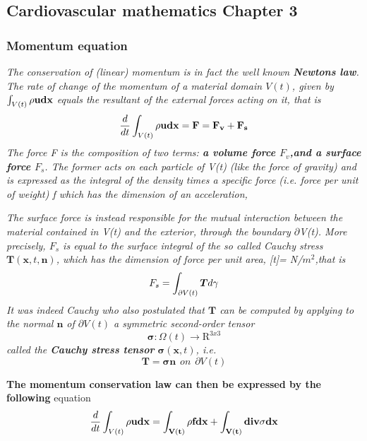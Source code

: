 \documentclass[11pt,letterpaper]{article}
\begin{document}
\subsection{Cardiovascular mathematics Chapter 3}

\subsubsection*{Momentum equation}
\textit{The conservation of (linear) momentum is in fact the well known \textbf{Newtons law}. The rate of change of the momentum of a material domain $V(t)$, given by $\int_{V(t)} \rho \bf{u} d\bf{x} $ equals the resultant of the external forces acting on it, that is \begin{equation}
   \frac{d}{dt} \int_{V(t)} \rho \bf{u} d\bf{x} = \bm{F} = \bm{F_v} + \bm{F_s}
\end{equation}
The force F is the composition of two terms:\textbf{ a volume force $F_v$,and a surface force $F_s$}. The former acts on each particle of V(t) (like the force of gravity) and is expressed as the integral of the density times a specific force (i.e. force per unit of weight) f which has the dimension of an acceleration,}

\textit{The surface force is instead responsible for the mutual interaction between the material contained in V(t) and the exterior, through the boundary $\partial$V(t). More precisely, $F_s$ is equal to the surface integral of the so called Cauchy
stress $\bm{T}(\bm{x}, t, \bm{n})$, which has the dimension of force per unit area, [t]= N/$m^2$,that is
\begin{equation}
    F_s =  \int_{\partial V(t)} \bm{T} d\bf{\gamma}
\end{equation}
It was indeed Cauchy who also postulated that $\bm{T}$ can be computed by
applying to the normal $\bm{n}$ of $\partial V(t)$ a symmetric second-order tensor
\begin{equation}
    \bm{\sigma} : \Omega(t) \longrightarrow \mathrm{R}^{3x3}
\end{equation}
called the \textbf{Cauchy stress tensor} $\bm{\sigma}(\bm{x},t)$, i.e.
\begin{equation}
    \bm{T} = \bm{\sigma}\bm{n} \hspace{5pt} on \hspace{5pt}  \partial V(t)
\end{equation}
}

{\color{red}\textbf{The momentum conservation law can then be expressed by the following}}
equation \begin{equation}
     \frac{d}{dt} \int_{V(t)} \rho \bf{u} d\bf{x} = \int_{V(t)} \rho \bf{f} d\bf{x} + \int_{V(t)} div \bf{\sigma} d\bf{x}
\end{equation}
\end{document}
